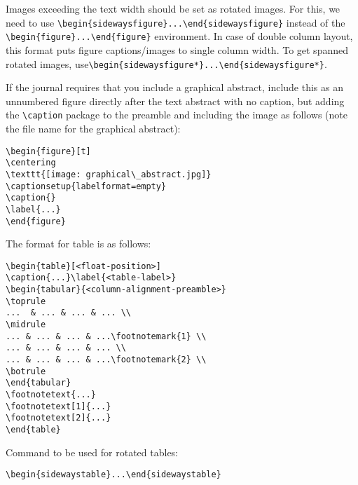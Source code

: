 \documentclass{article}
\begin{document}
Images exceeding the text width should be set as rotated images. For this, we need to use \verb+\begin{sidewaysfigure}...\end{sidewaysfigure}+ instead of the \verb+\begin{figure}...\end{figure}+ environment. In case of double column layout, this format puts figure captions/images to single column width. To get spanned rotated images, use\newline \verb+\begin{sidewaysfigure*}...\end{sidewaysfigure*}+.

If the journal requires that you include a graphical abstract, include this as an unnumbered figure directly after the text abstract with no caption, but adding the \verb+\caption+ package to the preamble and including the image as follows (note the file name for the graphical abstract):

\begin{verbatim}
\begin{figure}[t]
\centering
\texttt{[image: graphical\_abstract.jpg]}
\captionsetup{labelformat=empty}
\caption{}
\label{...}
\end{figure}
\end{verbatim}

The format for table is as follows:

\begin{verbatim}
\begin{table}[<float-position>]
\caption{...}\label{<table-label>}
\begin{tabular}{<column-alignment-preamble>}
\toprule
...  & ... & ... & ... \\
\midrule
... & ... & ... & ...\footnotemark{1} \\
... & ... & ... & ... \\
... & ... & ... & ...\footnotemark{2} \\
\botrule
\end{tabular}
\footnotetext{...}
\footnotetext[1]{...}
\footnotetext[2]{...}
\end{table}
\end{verbatim}

Command to be used for rotated tables:

\begin{verbatim}
\begin{sidewaystable}...\end{sidewaystable}
\end{verbatim}
\end{document}
